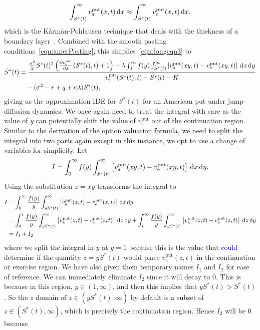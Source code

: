 			\begin{equation}
				\label{eqn:assump}
				\int_{S^*(t)}^\infty v_{\text{a}}^{\text{put}}(x,t) \, \mathrm d x \approx \int_{S^*(t)}^\infty  v_{\text{e}}^{\text{put}}(x,t) \, \mathrm d x,
			\end{equation}
		 which is the K\'arm\'an-Pohlausen technique that deals with the thickness of a boundary layer~\cite[pp. 421--423]{Zwillinger1998}. Combined with the smooth pasting conditions~\eqref{eqn:amerPasting}, this simplies~\eqref{eqn:longeqn3} to
			\begin{equation}
				\label{eqn:longeqn4}
				\begin{split}
				\dot{S}^*(t) &= \frac{\frac{\sigma^2}{2}S^*(t)^2\left( \frac{\partial  v_{\text{e}}^{\text{put}} }{\partial x}(S^*(t),t) + 1\right) - \lambda\int_0^\infty f(y) \int_{S^*(t)}^\infty \left[ v_{\text{a}}^{\text{put}}(xy,t) -  v_{\text{e}}^{\text{put}}(xy,t) \right] \, \mathrm d x \, \mathrm d y}{ v_{\text{e}}^{\text{put}}(S^*(t),t) + S^*(t) - K} \\
				&\quad{} - (\sigma^2 - r + q +\kappa\lambda)S^*(t),
				\end{split}
			\end{equation}
			giving us the approximation IDE for $S^*(t)$ for an American put under jump-diffusion dynamics. We once again need to treat the integral with care as the value of $y$ can potentially shift the value of $v_{\text{a}}^{\text{put}}$ out of the continuation region. Similar to the derivation of the option valuation formula, we need to split the integral into two parts again except in this instance, we opt to use a change of variables for simplicity. Let
				$$
					I = \int_0^\infty f(y) \int_{S^*(t)}^\infty \left[ v_{\text{a}}^{\text{put}}(xy,t) -  v_{\text{e}}^{\text{put}}(xy,t) \right] \, \mathrm d x \, \mathrm d y.
				$$ 
	Using the substitution $z = xy$ transforms the integral to
			\begin{align*}
				I &= \int_0^\infty \frac{f(y)}{y}\int_{yS^*(t)}^\infty \left[ v_{\text{a}}^{\text{put}}(z,t) -  v_{\text{e}}^{\text{put}}(z,t) \right] \, \mathrm d z\, \mathrm d y \\
				&= \int_0^1 \frac{f(y)}{y} \int_{yS^*(t)}^\infty \left[ v_{\text{a}}^{\text{put}}(z,t) -  v_{\text{e}}^{\text{put}}(z,t) \right] \, \mathrm d z\, \mathrm d y + \int_1^\infty\frac{f(y)}{y} \int_{yS^*(t)}^\infty \left[ v_{\text{a}}^{\text{put}}(z,t) -  v_{\text{e}}^{\text{put}}(z,t) \right] \, \mathrm d z\, \mathrm d y \\
				&= I_1 + I_2
			\end{align*}
	where we split the integral in $y$ at $y=1$ because this is the value that \textcolor{blue}{could} determine if the quantity $z = yS^*(t)$ would place $v_{\text{a}}^{\text{put}}(z,t)$ in the continuation or exercise region. We have also given them temporary names $I_1$ and $I_2$ for ease of reference. We can immediately eliminate $I_2$ since it will decay to 0. This is because in this region, $y \in (1,\infty)$, and then this implies that $yS^*(t) > S^*(t)$. So the $z$ domain of $z \in (yS^*(t),\infty)$ by default is a subset of $z \in (S^*(t),\infty)$, which is precisely the continuation region. Hence $I_2$ will be 0 because 

